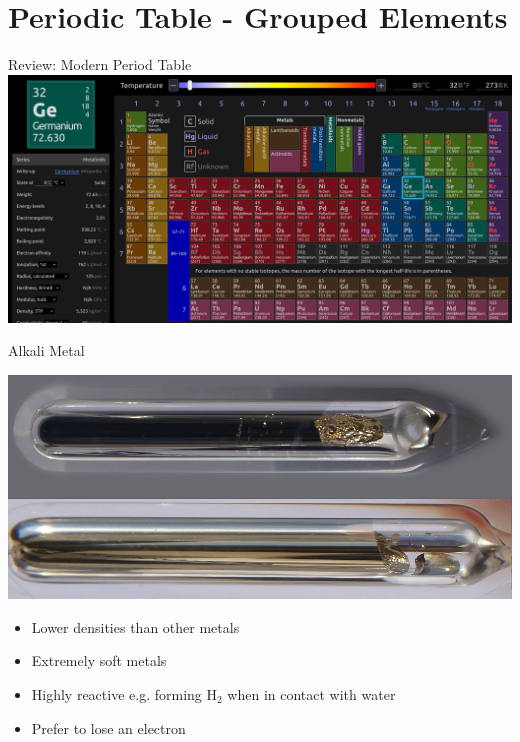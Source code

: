 \documentclass[11pt]{beamer}
\begin{document}
\section{Periodic Table - Grouped Elements}

\begin{frame}{Review: Modern Period Table}
  \centering
  \includegraphics[width=\linewidth]{ptable}
\end{frame}

\begin{frame}{Alkali Metal}
  \begin{center}
    \includegraphics[scale=0.2]{alkali_metal}
  \end{center}
  
  \begin{itemize}
  \item Lower densities than other metals
  \item Extremely soft metals
  \item Highly reactive e.g. forming H$_2$ when in
    contact with water
  \item Prefer to lose an electron
  \end{itemize}
\end{frame}
\end{document}
